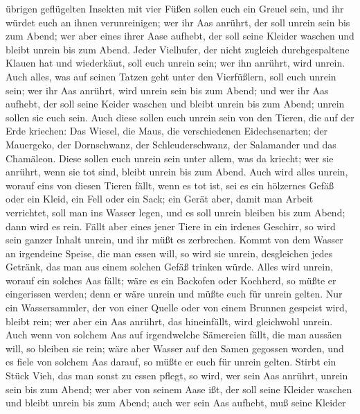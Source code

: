 übrigen geflügelten Insekten mit vier Füßen sollen euch ein Greuel sein,
 und ihr würdet euch an ihnen verunreinigen; wer ihr Aas
anrührt, der soll unrein sein bis zum Abend;  wer aber
eines ihrer Aase aufhebt, der soll seine Kleider waschen und bleibt
unrein bis zum Abend.  Jeder Vielhufer, der nicht
zugleich durchgespaltene Klauen hat und wiederkäut, soll euch unrein
sein; wer ihn anrührt, wird unrein.  Auch alles, was auf
seinen Tatzen geht unter den Vierfüßlern, soll euch unrein sein; wer ihr
Aas anrührt, wird unrein sein bis zum Abend;  und wer ihr
Aas aufhebt, der soll seine Keider waschen und bleibt unrein bis zum
Abend; unrein sollen sie euch sein.  Auch diese sollen
euch unrein sein von den Tieren, die auf der Erde kriechen: Das Wiesel,
die Maus, die verschiedenen Eidechsenarten;  der
Mauergeko, der Dornschwanz, der Schleuderschwanz, der Salamander und das
Chamäleon.  Diese sollen euch unrein sein unter allem,
was da kriecht; wer sie anrührt, wenn sie tot sind, bleibt unrein bis
zum Abend.  Auch wird alles unrein, worauf eins von
diesen Tieren fällt, wenn es tot ist, sei es ein hölzernes Gefäß oder
ein Kleid, ein Fell oder ein Sack; ein Gerät aber, damit man Arbeit
verrichtet, soll man ins Wasser legen, und es soll unrein bleiben bis
zum Abend; dann wird es rein.  Fällt aber eines jener
Tiere in ein irdenes Geschirr, so wird sein ganzer Inhalt unrein, und
ihr müßt es zerbrechen.  Kommt von dem Wasser an
irgendeine Speise, die man essen will, so wird sie unrein, desgleichen
jedes Getränk, das man aus einem solchen Gefäß trinken würde.
 Alles wird unrein, worauf ein solches Aas fällt; wäre es
ein Backofen oder Kochherd, so müßte er eingerissen werden; denn er wäre
unrein und müßte euch für unrein gelten.  Nur ein
Wassersammler, der von einer Quelle oder von einem Brunnen gespeist
wird, bleibt rein; wer aber ein Aas anrührt, das hineinfällt, wird
gleichwohl unrein.  Auch wenn von solchem Aas auf
irgendwelche Sämereien fällt, die man aussäen will, so bleiben sie rein;
 wäre aber Wasser auf den Samen gegossen worden, und es
fiele von solchem Aas darauf, so müßte er euch für unrein gelten.
 Stirbt ein Stück Vieh, das man sonst zu essen pflegt, so
wird, wer sein Aas anrührt, unrein sein bis zum Abend; 
wer aber von seinem Aase ißt, der soll seine Kleider waschen und bleibt
unrein bis zum Abend; auch wer sein Aas aufhebt, muß seine Kleider
